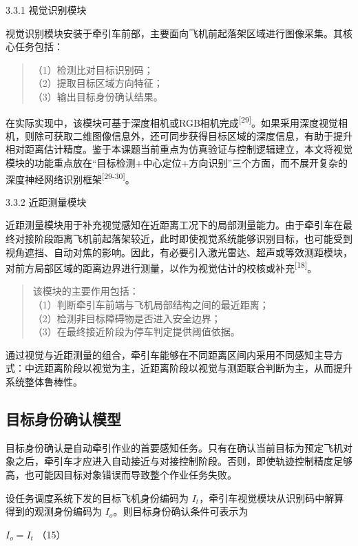 3.3.1 视觉识别模块

视觉识别模块安装于牵引车前部，主要面向飞机前起落架区域进行图像采集。其核心任务包括：

\begin{quote}
（1）检测比对目标识别码；\\
（2）提取目标区域方向特征；\\
（3）输出目标身份确认结果。
\end{quote}

在实际实现中，该模块可基于深度相机或RGB相机完成\textsuperscript{[29]}。如果采用深度视觉相机，则除可获取二维图像信息外，还可同步获得目标区域的深度信息，有助于提升相对距离估计精度。鉴于本课题当前重点为仿真验证与控制逻辑建立，本文将视觉模块的功能重点放在``目标检测+中心定位+方向识别''三个方面，而不展开复杂的深度神经网络识别框架\textsuperscript{[29-30]}。

3.3.2 近距测量模块

近距测量模块用于补充视觉感知在近距离工况下的局部测量能力。由于牵引车在最终对接阶段距离飞机前起落架较近，此时即使视觉系统能够识别目标，也可能受到视角遮挡、自动对焦的影响。因此，有必要引入激光雷达、超声或等效测距模块，对前方局部区域的距离边界进行测量，以作为视觉估计的校核或补充\textsuperscript{[18]}。

\begin{quote}
该模块的主要作用包括：\\
（1）判断牵引车前端与飞机局部结构之间的最近距离；\\
（2）检测非目标障碍物是否进入安全边界；\\
（3）在最终接近阶段为停车判定提供阈值依据。
\end{quote}

通过视觉与近距测量的组合，牵引车能够在不同距离区间内采用不同感知主导方式：中远距离阶段以视觉为主，近距离阶段以视觉与测距联合判断为主，从而提升系统整体鲁棒性。

\subsection{目标身份确认模型}

目标身份确认是自动牵引作业的首要感知任务。只有在确认当前目标为预定飞机对象之后，牵引车才应进入自动接近与对接控制阶段。否则，即使轨迹控制精度足够高，也可能因目标对象错误而导致整个作业任务失败。

设任务调度系统下发的目标飞机身份编码为
\(I_{t}\)，牵引车视觉模块从识别码中解算得到的观测身份编码为
\(I_{o}\)。则目标身份确认条件可表示为

\(I_{o} = I_{t}\) （15）

